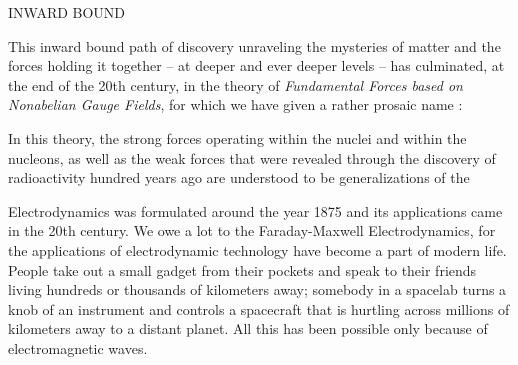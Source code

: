 \begin{center}
{INWARD BOUND}
\end{center}
{\fontsize{8pt}{10pt}}

\vspace{.2cm}

This inward bound path of discovery unraveling the mysteries of matter and the
forces holding it together – at deeper and ever deeper levels – has culminated,
at the end of the 20th century, in the theory of \textit{Fundamental Forces based on
Nonabelian Gauge Fields}, for which we have given a rather prosaic name :

\vspace{.2cm}
{\fontsize{8pt}{10pt}}

\vspace{.2cm}

In this theory, the strong forces operating within the nuclei and within the
nucleons, as well as the weak forces that were revealed through the discovery of
radioactivity hundred years ago are understood to be generalizations of the

\vspace{.2cm}
{\fontsize{8pt}{10pt}}

\vspace{.2cm}

Electrodynamics was formulated around the year 1875 and its applications
came in the 20th century. We owe a lot to the Faraday-Maxwell Electrodynamics,
for the applications of electrodynamic technology have become a part of modern
life. People take out a small gadget from their pockets and speak to their friends
living hundreds or thousands of kilometers away; somebody in a spacelab turns
a knob of an instrument and controls a spacecraft that is hurtling across millions
of kilometers away to a distant planet. All this has been possible only because of
electromagnetic waves.


